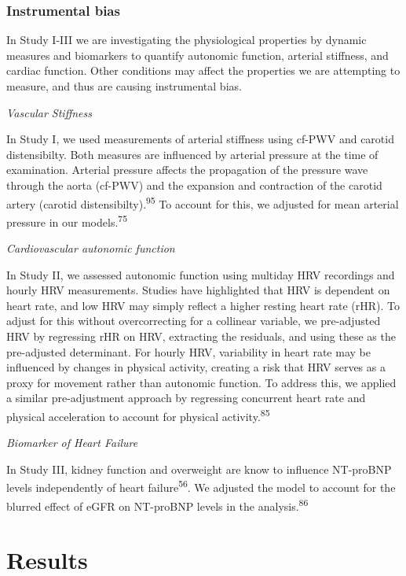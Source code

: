 \documentclass[
  letterpaper,
  headsepline=true,
  open=any]{scrbook}
\begin{document}
\hypertarget{instrumental-bias}{%
\subsection{Instrumental bias}\label{instrumental-bias}}

In Study I-III we are investigating the physiological properties by
dynamic measures and biomarkers to quantify autonomic function, arterial
stiffness, and cardiac function. Other conditions may affect the
properties we are attempting to measure, and thus are causing
instrumental bias.

\emph{Vascular Stiffness}

In Study I, we used measurements of arterial stiffness using cf-PWV and
carotid distensibilty. Both measures are influenced by arterial pressure
at the time of examination. Arterial pressure affects the propagation of
the pressure wave through the aorta (cf-PWV) and the expansion and
contraction of the carotid artery (carotid
distensibilty).\textsuperscript{95} To account for this, we adjusted for
mean arterial pressure in our models.\textsuperscript{75}

\emph{Cardiovascular autonomic function}

In Study II, we assessed autonomic function using multiday HRV
recordings and hourly HRV measurements. Studies have highlighted that
HRV is dependent on heart rate, and low HRV may simply reflect a higher
resting heart rate (rHR). To adjust for this without overcorrecting for
a collinear variable, we pre-adjusted HRV by regressing rHR on HRV,
extracting the residuals, and using these as the pre-adjusted
determinant. For hourly HRV, variability in heart rate may be influenced
by changes in physical activity, creating a risk that HRV serves as a
proxy for movement rather than autonomic function. To address this, we
applied a similar pre-adjustment approach by regressing concurrent heart
rate and physical acceleration to account for physical
activity.\textsuperscript{85}

\emph{Biomarker of Heart Failure}

In Study III, kidney function and overweight are know to influence
NT-proBNP levels independently of heart failure\textsuperscript{56}. We
adjusted the model to account for the blurred effect of eGFR on
NT-proBNP levels in the analysis.\textsuperscript{86}


\hypertarget{results}{%
\chapter{Results}\label{results}}
\end{document}
